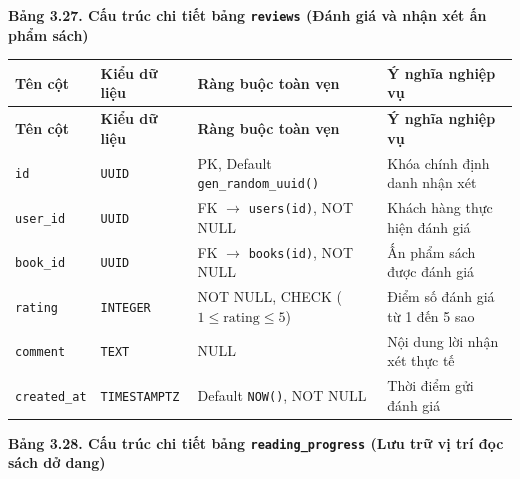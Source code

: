 \documentclass[11pt, a4paper]{report}
\begin{document}
\vspace{0.3cm}
\noindent\textbf{Bảng 3.27. Cấu trúc chi tiết bảng \texttt{reviews} (Đánh giá và nhận xét ấn phẩm sách)}
\nopagebreak

\begin{longtable}{p{3.2cm} p{2.6cm} p{4.0cm} p{4.5cm}}
\toprule
\textbf{Tên cột} & \textbf{Kiểu dữ liệu} & \textbf{Ràng buộc toàn vẹn} & \textbf{Ý nghĩa nghiệp vụ} \\
\midrule
\endfirsthead
\toprule
\textbf{Tên cột} & \textbf{Kiểu dữ liệu} & \textbf{Ràng buộc toàn vẹn} & \textbf{Ý nghĩa nghiệp vụ} \\
\midrule
\endhead
\bottomrule
\endfoot
\texttt{id} & \texttt{UUID} & PK, Default \texttt{gen\_random\_uuid()} & Khóa chính định danh nhận xét \\
\midrule
\texttt{user\_id} & \texttt{UUID} & FK $\rightarrow$ \texttt{users(id)}, NOT NULL & Khách hàng thực hiện đánh giá \\
\midrule
\texttt{book\_id} & \texttt{UUID} & FK $\rightarrow$ \texttt{books(id)}, NOT NULL & Ấn phẩm sách được đánh giá \\
\midrule
\texttt{rating} & \texttt{INTEGER} & NOT NULL, CHECK ($1 \le \text{rating} \le 5$) & Điểm số đánh giá từ 1 đến 5 sao \\
\midrule
\texttt{comment} & \texttt{TEXT} & NULL & Nội dung lời nhận xét thực tế \\
\midrule
\texttt{created\_at} & \texttt{TIMESTAMPTZ} & Default \texttt{NOW()}, NOT NULL & Thời điểm gửi đánh giá \\
\bottomrule
\end{longtable}

\vspace{0.3cm}
\noindent\textbf{Bảng 3.28. Cấu trúc chi tiết bảng \texttt{reading\_progress} (Lưu trữ vị trí đọc sách dở dang)}
\nopagebreak
\end{document}

